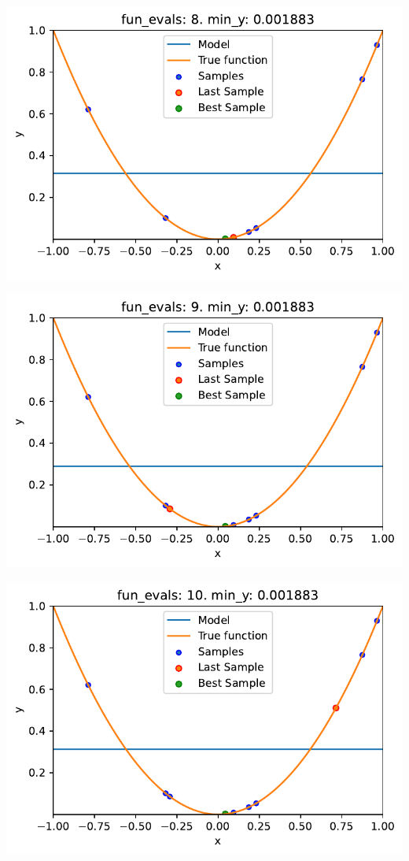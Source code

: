 \documentclass[
  letterpaper,
  DIV=11,
  numbers=noendperiod]{scrreprt}
\begin{document}
\includegraphics{010_num_spot_sklearn_surrogate_files/figure-pdf/cell-43-output-7.pdf}

\includegraphics{010_num_spot_sklearn_surrogate_files/figure-pdf/cell-43-output-8.pdf}

\includegraphics{010_num_spot_sklearn_surrogate_files/figure-pdf/cell-43-output-9.pdf}
\end{document}
